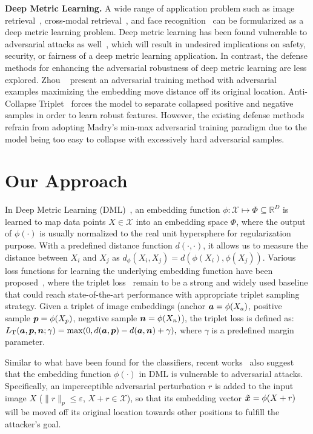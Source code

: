 \documentclass[10pt,twocolumn,letterpaper]{article}
\begin{document}
\textbf{Deep Metric Learning.}
%
A wide range of application problem such as image retrieval~\cite{imagesim2},
cross-modal retrieval~\cite{ladderloss}, and face recognition~\cite{facenet}
can be formularized as a deep metric learning problem.
%
Deep metric learning has been found vulnerable to adversarial attacks as
well~\cite{advrank,advorder}, which will result in undesired implications on
safety, security, or fairness of a deep metric learning application.
%
In contrast, the defense methods for enhancing the adversarial robustness of
deep metric learning are less explored.
%
Zhou \etal~\cite{advrank} present an adversarial training method with
adversarial examples maximizing the embedding move distance off its original
location.
%
Anti-Collapse Triplet~\cite{robrank} forces the model to separate collapsed
positive and negative samples in order to learn robust features.
%
However, the existing defense methods refrain from adopting Madry's min-max
adversarial training paradigm due to the model being too easy to collapse with
excessively hard adversarial samples.


\section{Our Approach}
\label{sec:3}

In Deep Metric Learning (DML)~\cite{revisiting,dmlreality}, an embedding
function $\phi:\mathcal{X}\mapsto \Phi \subseteq \mathbb{R}^D$ is learned to
map data points $X\in\mathcal{X}$ into an embedding space $\Phi$, where the
output of $\phi(\cdot)$ is usually normalized to the real unit hypersphere for
regularization purpose.
%
With a predefined distance function $d(\cdot,\cdot)$, it allows us to measure
the distance between $X_i$ and $X_j$ as
$d_\phi(X_i,X_j)=d(\phi(X_i),\phi(X_j))$.
%
Various loss functions for learning the underlying embedding function have been
proposed~\cite{revisiting,dmlreality}, where the triplet loss~\cite{facenet}
remain to be a strong and widely used baseline that could reach
state-of-the-art performance with appropriate triplet sampling strategy.
%
Given a triplet of image embeddings (anchor ${\bm{a}}=\phi(X_a)$, positive sample
${\bm{p}}=\phi(X_p)$, negative sample ${\bm{n}}=\phi(X_n)$), the triplet loss is defined
as:
%
$
%
	L_\text{T}(\va, \vp, \vn; \gamma) = \max(0, d(\va, \vp) - d(\va, \vn) +
	\gamma),
%
$
%
where $\gamma$ is a predefined margin parameter.

Similar to what have been found for the classifiers, recent
works~\cite{robrank,advrank,advorder} also suggest that the embedding function
$\phi(\cdot)$ in DML is vulnerable to adversarial attacks.
%
Specifically, an imperceptible adversarial perturbation $r$ is added to the
input image $X$ ($\|r\|_p \leq \varepsilon$, $X+r\in \mathcal{X}$), so that its
embedding vector $\tilde{{\bm{x}}}=\phi(X+r)$ will be moved off its original
location towards other positions to fulfill the attacker's goal.
\end{document}
